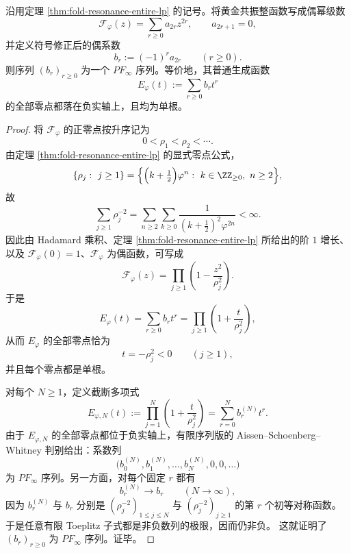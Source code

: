 \begin{theorem}\label{thm:conclusion-golden-resonance-even-coeff-pf-infty}
沿用定理 \ref{thm:fold-resonance-entire-lp} 的记号。将黄金共振整函数写成偶幂级数
\[
\mathcal F_\varphi(z)=\sum_{r\ge 0}a_{2r}z^{2r},
\qquad
a_{2r+1}=0,
\]
并定义符号修正后的偶系数
\[
b_r:=(-1)^r a_{2r}
\qquad (r\ge 0).
\]
则序列 \((b_r)_{r\ge 0}\) 为一个 \(PF_\infty\) 序列。等价地，其普通生成函数
\[
E_\varphi(t):=\sum_{r\ge 0}b_r t^r
\]
的全部零点都落在负实轴上，且均为单根。
\end{theorem}
\begin{proof}
将 \(\mathcal F_\varphi\) 的正零点按升序记为
\[
0<\rho_1<\rho_2<\cdots.
\]
由定理 \ref{thm:fold-resonance-entire-lp} 的显式零点公式，
\[
\{\rho_j:\ j\ge 1\}
=
\Bigl\{\Bigl(k+\tfrac12\Bigr)\varphi^n:\ k\in\ZZ_{\ge 0},\ n\ge 2\Bigr\},
\]
故
\[
\sum_{j\ge 1}\rho_j^{-2}
=
\sum_{n\ge 2}\sum_{k\ge 0}
\frac{1}{(k+\tfrac12)^2\varphi^{2n}}
<
\infty.
\]
因此由 Hadamard 乘积、定理 \ref{thm:fold-resonance-entire-lp} 所给出的阶 \(1\) 增长、以及 \(\mathcal F_\varphi(0)=1\)、\(\mathcal F_\varphi\) 为偶函数，可写成
\[
\mathcal F_\varphi(z)=\prod_{j\ge 1}\left(1-\frac{z^2}{\rho_j^2}\right).
\]
于是
\[
E_\varphi(t)
=
\sum_{r\ge 0}b_r t^r
=
\prod_{j\ge 1}\left(1+\frac{t}{\rho_j^2}\right),
\]
从而 \(E_\varphi\) 的全部零点恰为
\[
t=-\rho_j^2<0
\qquad (j\ge 1),
\]
并且每个零点都是单根。

对每个 \(N\ge 1\)，定义截断多项式
\[
E_{\varphi,N}(t):=\prod_{j=1}^{N}\left(1+\frac{t}{\rho_j^2}\right)
=
\sum_{r=0}^{N}b_r^{(N)}t^r.
\]
由于 \(E_{\varphi,N}\) 的全部零点都位于负实轴上，有限序列版的 Aissen--Schoenberg--Whitney 判别给出：系数列
\[
\bigl(b_0^{(N)},b_1^{(N)},\dots,b_N^{(N)},0,0,\dots\bigr)
\]
为 \(PF_\infty\) 序列。另一方面，对每个固定 \(r\) 都有
\[
b_r^{(N)}\longrightarrow b_r
\qquad (N\to\infty),
\]
因为 \(b_r^{(N)}\) 与 \(b_r\) 分别是 \((\rho_j^{-2})_{1\le j\le N}\) 与 \((\rho_j^{-2})_{j\ge 1}\) 的第 \(r\) 个初等对称函数。
于是任意有限 Toeplitz 子式都是非负数列的极限，因而仍非负。
这就证明了 \((b_r)_{r\ge 0}\) 为 \(PF_\infty\) 序列。证毕。
\end{proof}

